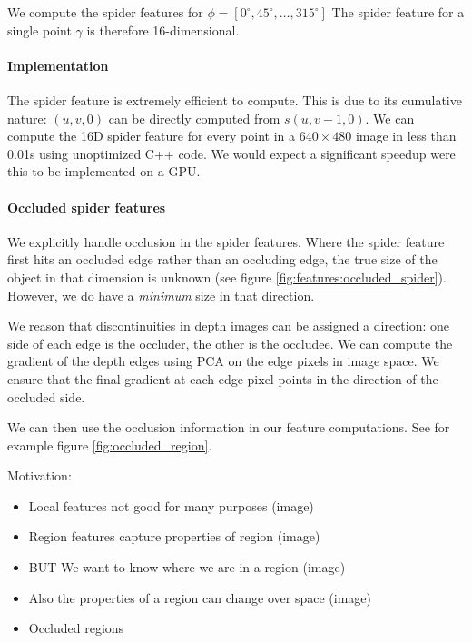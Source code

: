 \documentclass[10pt,twocolumn,letterpaper]{article}
\newcommand{\degree}{^{\circ}}
\newcommand{\rgbdimage}{\mathcal{D}}
\newcommand{\pixelidx}{\gamma}
\newcommand{\point}{\mathbf{p}}
\begin{document}

We compute the spider features for  $\phi = [0\degree, 45\degree, \ldots, 315\degree]$
The spider feature for a single point $\pixelidx$ is therefore 16-dimensional.

\paragraph{Implementation}
The spider feature is extremely efficient to compute.
This is due to its cumulative nature: $(u, v, 0)$ can be directly computed from $s(u, v-1, 0)$.
We can compute the 16D spider feature for every point in a $640\times480$ image in less than 0.01s using unoptimized C++ code.
We would expect a significant speedup were this to be implemented on a GPU.


\paragraph{Occluded spider features}

We explicitly handle occlusion in the spider features. Where the spider feature first hits an occluded edge rather than an occluding edge, the true size of the object in that dimension is unknown (see figure \ref{fig:features:occluded_spider}).
However, we do have a \textit{minimum} size in that direction.

We reason that discontinuities in depth images can be assigned a direction: one side of each edge is the occluder, the other is the occludee. 
We can compute the gradient of the depth edges using PCA on the edge pixels in image space.
We ensure that the final gradient at each edge pixel points in the direction of the occluded side.

We can then use the occlusion information in our feature computations.
See for example figure \ref{fig:occluded_region}.

Motivation:
\begin{itemize}
\item Local features not good for many purposes (image)
\item Region features capture properties of region (image)
\item BUT We want to know where we are in a region  (image)
\item Also the properties of a region can change over space (image)
\item Occluded regions
\end{itemize}
\end{document}
